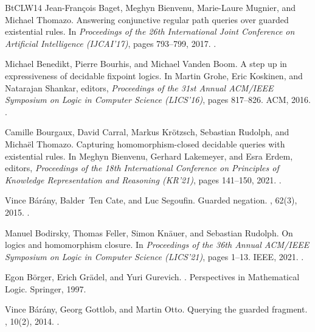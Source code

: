 \documentclass[10pt,a4paper]{amsart}
\theoremstyle{definition}
\numberwithin{equation}{section}
\theoremstyle{plain}
\theoremstyle{definition}
\theoremstyle{myexample}
\theoremstyle{plain}
\theoremstyle{definition}
\begin{document}
\begin{thebibliography}{BtCLW14}
Jean-François Baget, Meghyn Bienvenu, Marie-Laure Mugnier, and Michael
  Thomazo.
\newblock Answering conjunctive regular path queries over guarded existential
  rules.
\newblock In {\em Proceedings of the 26th International Joint Conference on
  Artificial Intelligence {(IJCAI'17)}}, pages 793--799, 2017.
\newblock \href {https://doi.org/10.24963/ijcai.2017/110}
  {}.

Michael Benedikt, Pierre Bourhis, and Michael {Vanden Boom}.
\newblock A step up in expressiveness of decidable fixpoint logics.
\newblock In Martin Grohe, Eric Koskinen, and Natarajan Shankar, editors, {\em
  Proceedings of the 31st Annual {ACM/IEEE} Symposium on Logic in Computer
  Science ({LICS}'16)}, pages 817--826. {ACM}, 2016.
\newblock \href {https://doi.org/10.1145/2933575.2933592}
  {}.

Camille Bourgaux, David Carral, Markus Kr{\"{o}}tzsch, Sebastian Rudolph, and
  Micha{\"{e}}l Thomazo.
\newblock Capturing homomorphism-closed decidable queries with existential
  rules.
\newblock In Meghyn Bienvenu, Gerhard Lakemeyer, and Esra Erdem, editors, {\em
  Proceedings of the 18th International Conference on Principles of Knowledge
  Representation and Reasoning ({KR}'21)}, pages 141--150, 2021.
\newblock \href {https://doi.org/10.24963/kr.2021/14}
  {}.

Vince B\'{a}r\'{a}ny, Balder~Ten Cate, and Luc Segoufin.
\newblock Guarded negation.
, 62(3), 2015.
\newblock \href {https://doi.org/10.1145/2701414} {}.

Manuel Bodirsky, Thomas Feller, Simon Kn{\"{a}}uer, and Sebastian Rudolph.
\newblock On logics and homomorphism closure.
\newblock In {\em Proceedings of the 36th Annual {ACM/IEEE} Symposium on Logic
  in Computer Science (LICS'21)}, pages 1--13. {IEEE}, 2021.
\newblock \href {https://doi.org/10.1109/LICS52264.2021.9470511}
  {}.

Egon B{\"{o}}rger, Erich Gr{\"{a}}del, and Yuri Gurevich.
.
\newblock Perspectives in Mathematical Logic. Springer, 1997.

Vince B{\'{a}}r{\'{a}}ny, Georg Gottlob, and Martin Otto.
\newblock Querying the guarded fragment.
, 10(2), 2014.
\newblock \href {https://doi.org/10.2168/LMCS-10(2:3)2014}
  {}.


\end{thebibliography}
\end{document}

